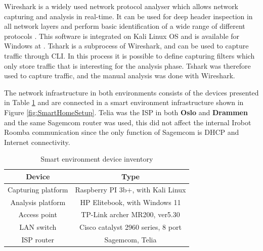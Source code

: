 Wireshark \cite{wireshark} is a widely used network protocol analyser which allows network capturing and analysis in real-time. It can be used for deep header inspection in all network layers and perform basic identification of a wide range of different protocols \cite{wireshark}. This software is integrated on Kali Linux OS and is available for Windows at \cite{wireshark_download_2016}. Tshark is a subprocess of Wireshark, and can be used to capture traffic through CLI. In this process it is possible to define capturing filters which only store traffic that is interesting for the analysis phase. Tshark was therefore used to capture traffic, and the manual analysis was done with Wireshark.

The network infrastructure in both environments consists of the devices presented in Table \ref{tab:networkdevices} and are connected in a smart environment infrastructure shown in Figure \ref{fig:SmartHomeSetup}. Telia was the ISP in both \textbf{Oslo} and \textbf{Drammen} and the same Sagemcom router was used, this did not affect the internal Irobot Roomba communication since the only function of Sagemcom is DHCP and Internet connectivity. 

\begin{table}[H]
\centering
\caption{Smart environment device inventory}
\label{tab:networkdevices}
\begin{tabular}{|c|c|}
\hline
\textbf{Device}    & \textbf{Type}                      \\ \hline
Capturing platform & Raspberry PI 3b+, with Kali Linux  \\ \hline
Analysis platform  & HP Elitebook, with Windows 11      \\ \hline
Access point       & TP-Link archer MR200, ver5.30      \\ \hline
LAN switch         & Cisco catalyst 2960 series, 8 port \\ \hline
ISP router         & Sagemcom, Telia                    \\ \hline
\end{tabular}
\end{table}



